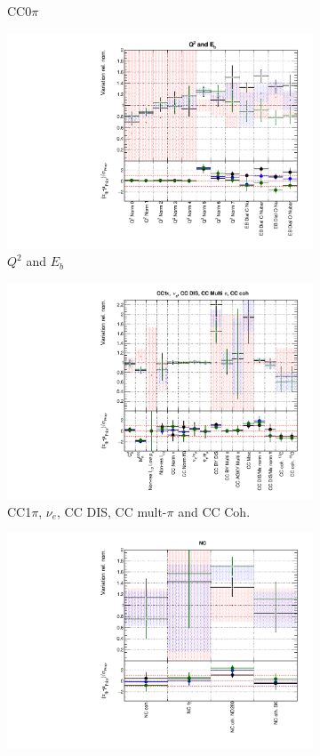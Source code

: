 \begin{figure}
\begin{subfigure}{0.49\textwidth}
  \caption{CC0$\pi$}
\end{subfigure}
\begin{subfigure}{0.49\textwidth}
  \centering
  \includegraphics[width=0.9\linewidth]{figs/fgdfitsxsec_2}
  \caption{$Q^2$ and $E_b$}
\end{subfigure}
\begin{subfigure}{0.49\textwidth}
  \centering
  \includegraphics[width=0.9\linewidth]{figs/fgdfitsxsec_3}
  \caption{CC1$\pi$, $\nu_e$, CC DIS, CC mult-$\pi$ and CC Coh.}
\end{subfigure}
\begin{subfigure}{0.49\textwidth}
  \centering
  \includegraphics[width=0.9\linewidth]{figs/fgdfitsxsec_4}

\end{subfigure}
\end{figure}
